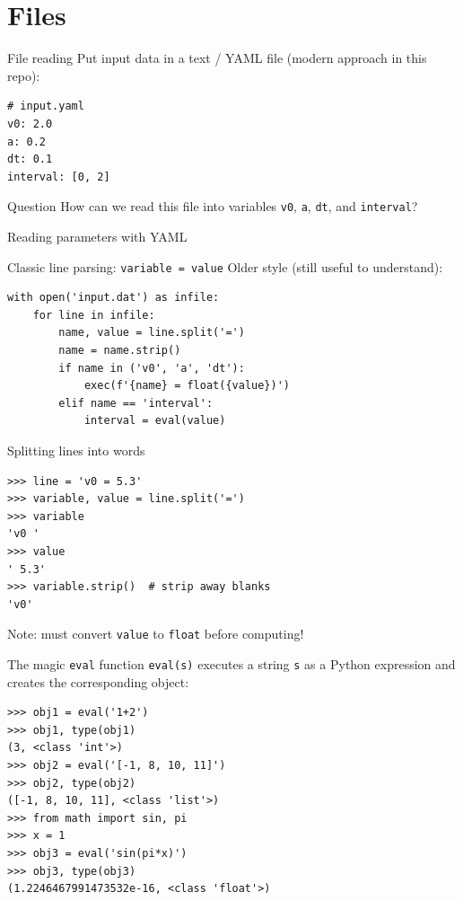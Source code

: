 \section{Files}

\begin{frame}[fragile]{File reading}
  Put input data in a text / YAML file (modern approach in this repo):
\begin{lstlisting}[style=terminal]
# input.yaml
v0: 2.0
a: 0.2
dt: 0.1
interval: [0, 2]
\end{lstlisting}
  \begin{alertblock}{Question}
    How can we read this file into variables \texttt{v0}, \texttt{a},
    \texttt{dt}, and \texttt{interval}?
  \end{alertblock}
\end{frame}

\begin{frame}[fragile]{Reading parameters with YAML}

\end{frame}

\begin{frame}[fragile]{Classic line parsing: \texttt{variable = value}}
  Older style (still useful to understand):
\begin{lstlisting}[style=pythonTiny]
with open('input.dat') as infile:
    for line in infile:
        name, value = line.split('=')
        name = name.strip()
        if name in ('v0', 'a', 'dt'):
            exec(f'{name} = float({value})')
        elif name == 'interval':
            interval = eval(value)
\end{lstlisting}
\end{frame}

\begin{frame}[fragile]{Splitting lines into words}
\begin{lstlisting}[style=pythonTiny]
>>> line = 'v0 = 5.3'
>>> variable, value = line.split('=')
>>> variable
'v0 '
>>> value
' 5.3'
>>> variable.strip()  # strip away blanks
'v0'
\end{lstlisting}
  Note: must convert \texttt{value} to \texttt{float} before computing!
\end{frame}

\begin{frame}[fragile]{The magic \texttt{eval} function}
  \texttt{eval(s)} executes a string \texttt{s} as a Python expression
  and creates the corresponding object:
\begin{lstlisting}[style=pythonTiny]
>>> obj1 = eval('1+2')
>>> obj1, type(obj1)
(3, <class 'int'>)
>>> obj2 = eval('[-1, 8, 10, 11]')
>>> obj2, type(obj2)
([-1, 8, 10, 11], <class 'list'>)
>>> from math import sin, pi
>>> x = 1
>>> obj3 = eval('sin(pi*x)')
>>> obj3, type(obj3)
(1.2246467991473532e-16, <class 'float'>)
\end{lstlisting}
\end{frame}

